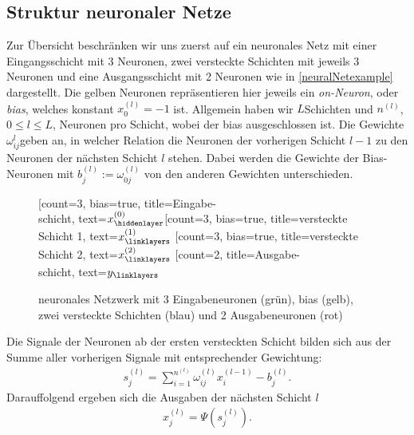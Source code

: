 \subsection{Struktur neuronaler Netze}
\label{subsec:struktur-eines-neuronalen-netzes}
Zur Übersicht beschränken wir uns zuerst auf ein neuronales Netz mit einer Eingangsschicht mit $3$ Neuronen, zwei
versteckte Schichten mit jeweils 3 Neuronen und eine Ausgangsschicht mit 2 Neuronen wie in \eqref{neuralNetexample}
dargestellt. Die gelben Neuronen repräsentieren hier jeweils ein \textit{on-Neuron}, oder \textit{bias}, welches
konstant $x_0^{(l)} = -1$ ist. Allgemein haben wir $L$Schichten und $n^{(l)}$, $0\leq l \leq L$, Neuronen pro Schicht,
wobei der bias ausgeschlossen ist. Die Gewichte $\omega_{ij}^{l}$geben an, in welcher Relation die Neuronen der vorherigen
Schicht $l-1$ zu den Neuronen der nächsten Schicht $l$ stehen. Dabei werden die Gewichte der Bias-Neuronen mit
$b_j^{(l)}:= \omega_{0j}^{(l)}$ von den anderen Gewichten unterschieden.
\begin{figure}[htp]
    \centering
    \begin{neuralnetwork}[height=4]
        \newcommand{\x}[2]{$x^{(0)}_#2$}
        \newcommand{\y}[2]{$y_#2$}
        \newcommand{\hfirst}[2]{\small $x^{(1)}_#2$}
        \newcommand{\hsecond}[2]{\small $x^{(2)}_#2$}
        [count=3, bias=true, title=Eingabe-\\schicht, text=\x]
        \hiddenlayer[count=3, bias=true, title=versteckte\\Schicht 1, text=\hfirst]
        \linklayers
        \hiddenlayer[count=3, bias=true, title=versteckte\\Schicht 2, text=\hsecond]
        \linklayers
        \outputlayer[count=2, title=Ausgabe-\\schicht, text=\y] \linklayers
    \end{neuralnetwork}
    \caption{neuronales Netzwerk mit 3 Eingabeneuronen (grün), bias (gelb), zwei versteckte Schichten
        (blau) und 2 Ausgabeneuronen (rot)}
    \label{neuralNetexample}
\end{figure}
Die Signale der Neuronen ab der ersten versteckten Schicht bilden sich aus der Summe aller vorherigen
Signale mit entsprechender Gewichtung:
\begin{align}
    s_j^{(l)} = \sum_{i=1}^{n^{(l)}} \omega_{ij}^{(l)} x_i^{(l-1)} - b_j^{(l)}. \label{eq:signal}
\end{align}
Darauffolgend ergeben sich die Ausgaben der nächsten Schicht $l$
\begin{align}
    x_j^{(l)}=\Psi(s_j^{(l)}). \label{eq:activ}
\end{align}
